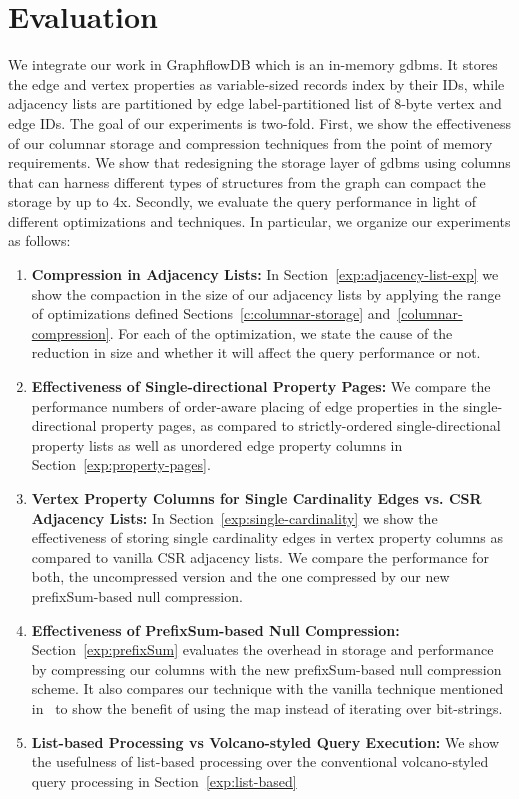 \chapter{Evaluation}
\label{c:evaluation}

We integrate our work in GraphflowDB which is an in-memory \gls{gdbms}. It stores the edge and vertex properties as variable-sized records index by their IDs, while adjacency lists are partitioned by edge label-partitioned list of 8-byte vertex and edge IDs. The goal of our experiments is two-fold. First, we show the effectiveness of our columnar storage and compression techniques from the point of memory requirements. We show that redesigning the storage layer of \gls{gdbms} using columns that can harness different types of structures from the graph can compact the storage by up to 4x. Secondly, we evaluate the query performance in light of different optimizations and techniques. In particular, we organize our experiments as follows:

\begin{enumerate}
	\item \textbf{Compression in Adjacency Lists:}  In Section~\ref{exp:adjacency-list-exp} we show the compaction in the size of our adjacency lists by applying the range of optimizations defined Sections~\ref{c:columnar-storage} and~\ref{columnar-compression}. For each of the optimization, we state the cause of the reduction in size and whether it will affect the query performance or not.
	
	\item \textbf{Effectiveness of Single-directional Property Pages:} We compare the performance numbers of order-aware placing of edge properties in the single-directional property pages, as compared to strictly-ordered single-directional property lists as well as unordered edge property columns in Section~\ref{exp:property-pages}.
	
	\item \textbf{Vertex Property Columns for Single Cardinality Edges vs. CSR Adjacency Lists:}  In Section~\ref{exp:single-cardinality} we show the effectiveness of storing single cardinality edges in vertex property columns as compared to vanilla CSR adjacency lists. We compare the performance for both, the uncompressed version and the one compressed by our new prefixSum-based null compression.
	
	\item \textbf{Effectiveness of PrefixSum-based Null Compression:}  Section~\ref{exp:prefixSum} evaluates the overhead in storage and performance by compressing our columns with the new prefixSum-based null compression scheme. It also compares our technique with the vanilla technique mentioned in~\cite{abadi-sparse-col} to show the benefit of using the map instead of iterating over bit-strings.
	
	\item \textbf{List-based Processing vs Volcano-styled Query Execution:} We show the usefulness of list-based processing over the conventional volcano-styled query processing in Section~\ref{exp:list-based}
	
\end{enumerate}

